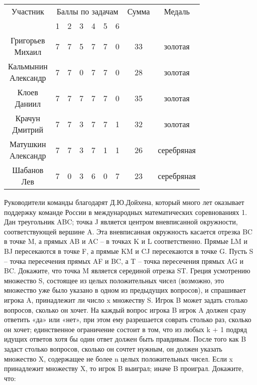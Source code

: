 \documentclass[a4paper,12pt]{article}
\begin{document}
\setlength{\tabcolsep}{6pt} %
\fontsize{8}{12}\selectfont
\begin{multicols}{2}
    \begin{tabular}{c c c c c c c c c}
        Участник & \multicolumn{6}{c}{Баллы по задачам} & Сумма & Медаль \\ 
        & 1 & 2 & 3 & 4 & 5 & 6 & & \\ 
        \makecell[{{p{1.5cm}}}]{\raggedright Григорьев\\Михаил} & 7 & 7 & 5 & 7 & 7 & 0 & 33 & золотая \\ 
        \makecell[{{p{1.5cm}}}]{\raggedright Кальмынин\\Александр} & 7 & 7 & 0 & 7 & 7 & 0 & 28 & золотая \\ 
        \makecell[{{p{1.5cm}}}]{\raggedright Клоев\\Даниил} & 7 & 7 & 7 & 7 & 7 & 0 & 35 & золотая \\ 
        \makecell[{{p{1.5cm}}}]{\raggedright Крачун\\Дмитрий} & 7 & 7 & 3 & 7 & 7 & 1 & 32 & золотая \\ 
        \makecell[{{p{1.5cm}}}]{\raggedright Матушкин\\Александр} & 7 & 7 & 3 & 7 & 1 & 1 & 26 & серебряная \\ 
        \makecell[{{p{1.5cm}}}]{\raggedright Шабанов\\Лев} & 7 & 0 & 3 & 6 & 0 & 7 & 23 & серебряная \\ 
    \end{tabular}
    Руководители команды благодарят Д.Ю.Дойхена, который много лет оказывает поддержку команде России в международных математических соревнованиях   
    1. Дан треугольник ABC; точка J является центром вневписанной окружности, соответствующей вершине A. Эта вневписанная окружность касается отрезка BC в точке M, а прямых AB и AC – в точках K и L соответственно. Прямые LM и BJ пересекаются в точке F, а прямые KM и CJ пересекаются в точке G. Пусть S – точка пересечения прямых AF и BC, а T – точка пересечения прямых AG и BC. Докажите, что точка M является серединой отрезка ST. Греция
    \columnbreak
    усмотрению множество S, состоящее из целых положительных чисел (возможно, это множество уже было указано в одном из предыдущих вопросов), и спрашивает игрока A, принадлежит ли число x множеству S. Игрок B может задать столько вопросов, сколько он хочет. На каждый вопрос игрока B игрок A должен сразу ответить «да» или «нет», при этом ему разрешается соврать столько раз, сколько он хочет; единственное ограничение состоит в том, что из любых k + 1 подряд идущих ответов хотя бы один ответ должен быть правдивым. После того как B задаст столько вопросов, сколько он сочтет нужным, он должен указать множество X, содержащее не более n целых положительных чисел. Если x принадлежит множеству X, то игрок B выиграл; иначе B проиграл. Докажите, что:
    \end{multicols}
\end{document}

